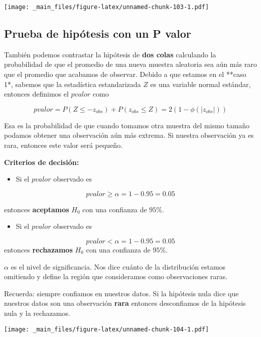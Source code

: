 \documentclass[
]{book}
\providecommand{\tightlist}{%
  \setlength{\itemsep}{0pt}\setlength{\parskip}{0pt}}
\begin{document}
\texttt{[image: \_main\_files/figure-latex/unnamed-chunk-103-1.pdf]}

\hypertarget{prueba-de-hipuxf3tesis-con-un-p-valor}{%
\subsection{Prueba de hipótesis con un P valor}\label{prueba-de-hipuxf3tesis-con-un-p-valor}}

También podemos contrastar la hipótesis de \textbf{dos colas} calculando la probabilidad de que el promedio de una nueva muestra aleatoria sea aún más raro que el promedio que acabamos de observar. Debido a que estamos en el **caso 1*, sabemos que la estadística estandarizada \(Z\) es una variable normal estándar, entonces definimos el \(pvalor\) como

\[pvalor = P(Z \leq -z_{obs}) + P(z_{obs} \leq Z) = 2 (1-\phi(|z_{obs}|))\]

Esa es la probabilidad de que cuando tomamos otra muestra del mismo tamaño podamos obtener una observación aún más extrema. Si nuestra observación ya es rara, entonces este valor será pequeño.

\textbf{Criterios de decisión:}

\begin{itemize}
\tightlist
\item
  Si el \(pvalor\) observado es
\end{itemize}

\[pvalor \geq \alpha =1-0.95=0.05\]

entonces \textbf{aceptamos} \(H_0\) con una confianza de \(95\%\).

\begin{itemize}
\tightlist
\item
  Si el \(pvalor\) observado es
\end{itemize}

\[pvalor < \alpha =1-0.95=0.05\]
entonces \textbf{rechazamos} \(H_0\) con una confianza de \(95\%\).

\(\alpha\) es el nivel de significancia. Nos dice cuánto de la distribución estamos omitiendo y define la región que consideramos como observaciones raras.

Recuerda: siempre confiamos en nuestros datos. Si la hipótesis nula dice que nuestros datos son una observación \textbf{rara} entonces desconfiamos de la hipótesis nula y la rechazamos.

\texttt{[image: \_main\_files/figure-latex/unnamed-chunk-104-1.pdf]}
\end{document}

